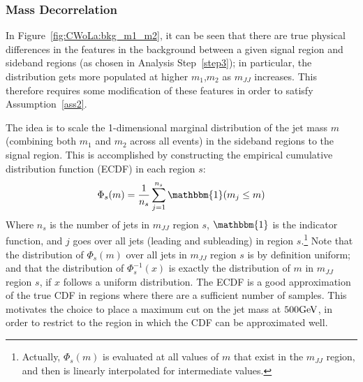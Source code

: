 \FloatBarrier
\subsubsection{Mass Decorrelation}
\label{sec:CWoLa:decorrelation}
In Figure~\ref{fig:CWoLa:bkg_m1_m2}, it can be seen that there are true physical differences in the features in the background between a given signal region and sideband regions (as chosen in Analysis Step~\ref{step3}); in particular, the distribution gets more populated at higher $m_1$,$m_2$ as $m_{JJ}$ increases.
This therefore requires some modification of these features in order to satisfy Assumption~\ref{ass2}.

The idea is to scale the 1-dimensional marginal distribution of the jet mass $m$ (combining both $m_1$ and $m_2$ across all events) in the sideband regions to the signal region.
This is accomplished by constructing the empirical cumulative distribution function (ECDF) in each region $s$:
\begin{align}
  \Phi_s(m) = \frac{1}{n_s} \sum_{j=1}^{n_s} \mathbbm{1}(m_j\le m)
\end{align}
Where $n_s$ is the number of jets in $m_{JJ}$ region $s$, $\mathbbm{1}$ is the indicator function, and $j$ goes over all jets (leading and subleading) in region $s$.\footnote{Actually, $\Phi_s(m)$ is evaluated at all values of $m$ that exist in the $m_{JJ}$ region, and then is linearly interpolated for intermediate values.}
Note that the distribution of $\Phi_s(m)$ over all jets in $m_{JJ}$ region $s$ is by definition uniform; and that the distribution of $\Phi^{-1}_s(x)$ is exactly the distribution of $m$ in $m_{JJ}$ region $s$, if $x$ follows a uniform distribution.
The ECDF is a good approximation of the true CDF in regions where there are a sufficient number of samples.
This motivates the choice to place a maximum cut on the jet mass at $500 \mathrm{GeV}$, in order to restrict to the region in which the CDF can be approximated well.

